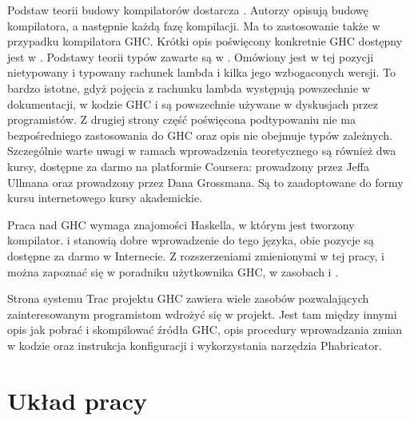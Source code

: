 Podstaw teorii budowy kompilatorów dostarcza \cite{Dragon}. Autorzy opisują
budowę kompilatora, a następnie każdą fazę kompilacji. Ma to zastosowanie także
w przypadku kompilatora GHC. Krótki opis poświęcony konkretnie GHC dostępny jest
w \cite{AOSA}. Podstawy teorii typów zawarte są w \cite{TAPL}. Omówiony jest w
tej pozycji nietypowany i typowany rachunek lambda i kilka jego wzbogaconych
wersji. To bardzo istotne, gdyż pojęcia z rachunku lambda występują powszechnie
w dokumentacji, w kodzie GHC i są powszechnie używane w dyskusjach przez
programistów. Z drugiej strony część poświęcona podtypowaniu nie ma
bezpośredniego zastosowania do GHC oraz opis nie obejmuje typów
zależnych. Szczególnie warte uwagi w ramach wprowadzenia teoretycznego są
również dwa kursy, dostępne za darmo na platformie Coursera: 
prowadzony przez Jeffa Ullmana oraz  prowadzony
przez Dana Grossmana. Są to zaadoptowane do formy kursu internetowego kursy
akademickie.

Praca nad GHC wymaga znajomości Haskella, w którym jest tworzony
kompilator. \cite{LearnYouAHaskell} i \cite{RealWorldHaskell} stanowią dobre
wprowadzenie do tego języka, obie pozycje są dostępne za darmo w Internecie. Z
rozszerzeniami zmienionymi w tej pracy,  i
 można zapoznać się w poradniku użytkownika GHC, w
zasobach \cite{GuideTypeFamilies} i \cite{GuidePartialTypeSignatures}.

Strona systemu Trac projektu GHC zawiera wiele zasobów pozwalających
zainteresowanym programistom wdrożyć się w projekt. Jest tam między innymi opis
jak pobrać i skompilować źródła GHC\cite{WikiNewcomers}, opis procedury
wprowadzania zmian w kodzie\cite{WikiFixingBugs} oraz instrukcja konfiguracji i
wykorzystania narzędzia Phabricator\cite{WikiPhabricator}.


\section{Układ pracy}\label{sec:uklad_pracy}

